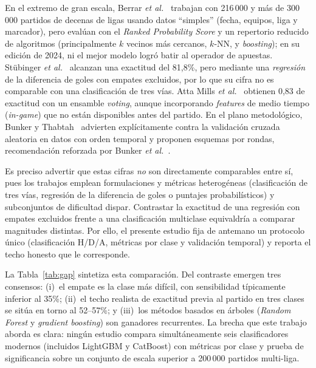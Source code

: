 \documentclass[conference]{IEEEtran}
\begin{document}
En el extremo de gran escala, Berrar \emph{et al.}~\cite{berrar2019,berrar2024} trabajan
con 216\,000 y m\'as de 300\,000 partidos de decenas de ligas usando datos ``simples''
(fecha, equipos, liga y marcador), pero eval\'uan con el \emph{Ranked Probability Score} y
un repertorio reducido de algoritmos (principalmente $k$ vecinos m\'as cercanos, $k$-NN, y
\emph{boosting}); en su edici\'on de 2024, ni el mejor modelo logr\'o batir al operador de
apuestas. St\"ubinger \emph{et al.}~\cite{stubinger2020} alcanzan una exactitud del 81,8\%,
pero mediante una \emph{regresi\'on} de la diferencia de goles con empates excluidos, por lo
que su cifra no es comparable con una clasificaci\'on de tres v\'ias. Atta Mills \emph{et
al.}~\cite{attamills2024} obtienen 0,83 de exactitud con un ensamble \emph{voting}, aunque
incorporando \emph{features} de medio tiempo (\emph{in-game}) que no est\'an disponibles
antes del partido. En el plano metodol\'ogico, Bunker y Thabtah~\cite{bunker2019} advierten
expl\'icitamente contra la validaci\'on cruzada aleatoria en datos con orden temporal y
proponen esquemas por rondas, recomendaci\'on reforzada por Bunker \emph{et al.}~\cite{bunker2024}.

Es preciso advertir que estas cifras \emph{no} son directamente comparables entre s\'i,
pues los trabajos emplean formulaciones y m\'etricas heterog\'eneas (clasificaci\'on de
tres v\'ias, regresi\'on de la diferencia de goles o puntajes probabil\'isticos) y
subconjuntos de dificultad dispar. Contrastar la exactitud de una regresi\'on con empates
excluidos frente a una clasificaci\'on multiclase equivaldr\'ia a comparar magnitudes
distintas. Por ello, el presente estudio fija de antemano un protocolo \'unico
(clasificaci\'on H/D/A, m\'etricas por clase y validaci\'on temporal) y reporta el techo
honesto que le corresponde.

La Tabla~\ref{tab:gap} sintetiza esta comparaci\'on. Del contraste emergen tres consensos:
(i)~el empate es la clase m\'as dif\'icil, con sensibilidad t\'ipicamente inferior al
35\%; (ii)~el techo realista de exactitud previa al partido en tres clases se sit\'ua en
torno al 52--57\%; y (iii)~los m\'etodos basados en \'arboles (\emph{Random Forest} y
\emph{gradient boosting}) son ganadores recurrentes. La brecha que este trabajo aborda es
clara: ning\'un estudio compara simult\'aneamente seis clasificadores modernos (incluidos
LightGBM y CatBoost) con m\'etricas por clase y prueba de significancia sobre un conjunto
de escala superior a 200\,000 partidos multi-liga.
\end{document}
